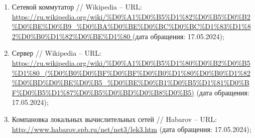 \begin{enumerate}
	\item  Сетевой коммутатор // Wikipedia -- URL: \url{https://ru.wikipedia.org/wiki/%D0%A1%D0%B5%D1%82%D0%B5%D0%B2%D0%BE%D0%B9_%D0%BA%D0%BE%D0%BC%D0%BC%D1%83%D1%82%D0%B0%D1%82%D0%BE%D1%80 }(дата обращения: 17.05.2024);
	
	\item  Сервер // Wikipedia -- URL: \url{https://ru.wikipedia.org/wiki/%D0%A1%D0%B5%D1%80%D0%B2%D0%B5%D1%80_(%D0%B0%D0%BF%D0%BF%D0%B0%D1%80%D0%B0%D1%82%D0%BD%D0%BE%D0%B5_%D0%BE%D0%B1%D0%B5%D1%81%D0%BF%D0%B5%D1%87%D0%B5%D0%BD%D0%B8%D0%B5)} (дата обращения: 17.05.2024);
	
	\item Компановка локальных вычислительных сетей // Habarov -- URL: \url{http://www.habarov.spb.ru/net/net3/lek3.htm} (дата обращения: 17.05.2024);
\end{enumerate}